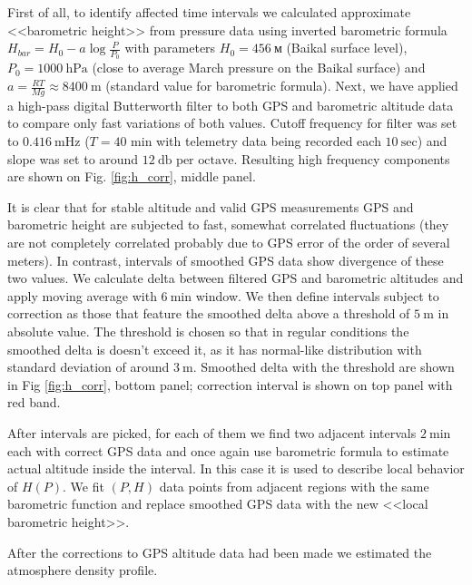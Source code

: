 \documentclass[final,5p,times,twocolumn]{elsarticle}
\begin{document}
First of all, to identify affected time intervals we calculated approximate <<barometric height>> from pressure data using inverted barometric formula $H_{bar} = H_0 - a \log \frac{P}{P_0}$ with parameters $H_0 = 456~\textrm{м}$ (Baikal surface level), $P_0 = 1000~\textrm{hPa}$ (close to average March pressure on the Baikal surface) and $a = \frac{RT}{Mg} \approx 8400~\textrm{m}$ (standard value for barometric formula). Next, we have applied a high-pass digital Butterworth filter to both GPS and barometric altitude data to compare only fast variations of both values. Cutoff frequency for filter was set to $0.416~\textrm{mHz}$ ($T=40$ min with telemetry data being recorded each $10~\textrm{sec}$) and slope was set to around $12~\textrm{db per octave}$. Resulting high frequency components are shown on Fig. \ref{fig:h_corr}, middle panel.

It is clear that for stable altitude and valid GPS measurements GPS and barometric height are subjected to fast, somewhat correlated fluctuations (they are not completely correlated probably due to GPS error of the order of several meters). In contrast, intervals of smoothed GPS data show divergence of these two values. We calculate delta between filtered GPS and barometric altitudes and apply moving average with $6~\textrm{min}$ window. We then define intervals subject to correction as those that feature the smoothed delta above a threshold of $5~\textrm{m}$ in absolute value. The threshold is chosen so that in regular conditions the smoothed delta is doesn't exceed it, as it has normal-like distribution with standard deviation of around $3~\textrm{m}$. Smoothed delta with the threshold are shown in Fig \ref{fig:h_corr}, bottom panel; correction interval is shown on top panel with red band.

After intervals are picked, for each of them we find two adjacent intervals $2~\textrm{min}$ each with correct GPS data and once again use barometric formula to estimate actual altitude inside the interval. In this case it is used to describe local behavior of $H(P)$. We fit $(P, H)$ data points from adjacent regions with the same barometric function and replace smoothed GPS data with the new <<local barometric height>>.

After the corrections to GPS altitude data had been made we estimated the atmosphere density profile.
\end{document}
